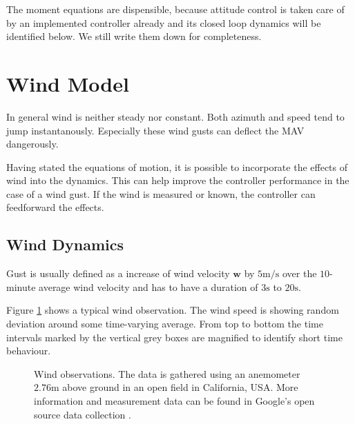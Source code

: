 The moment equations are dispensible, because attitude control is taken care of by an implemented controller already and its closed loop dynamics will be identified below. We still write them down for completeness.

\section{Wind Model}
In general wind is neither steady nor constant. Both azimuth and speed tend to jump instantanously. Especially these wind gusts can deflect the MAV dangerously.

Having stated the equations of motion, it is possible to incorporate the effects of wind into the dynamics. This can help improve the controller performance in the case of a wind gust. If the wind is measured or known, the controller can feedforward the effects.

\subsection{Wind Dynamics}
Gust is usually defined as a increase of wind velocity $\mathbf{w}$ by $5\si{\metre\per\second}$ over the $10$-minute average wind velocity and has to have a duration of $3 \si{\second}$ to $20 \si{\second}$.

Figure \ref{fig:wind_observations} shows a typical wind observation. The wind speed is showing random deviation around some time-varying average. From top to bottom the time intervals marked by the vertical grey boxes are magnified to identify short time behaviour.


\begin{figure}
\centering
{}
\qquad
{}
\qquad
{}
\caption[Wind observations]{Wind observations. The data is gathered using an anemometer $2.76 \si{\metre}$ above ground in an open field in California, USA. More information and measurement data can be found in Google's open source data collection \cite{www:googleosb,www:googleheliostat}.}
\label{fig:wind_observations}
\end{figure}



